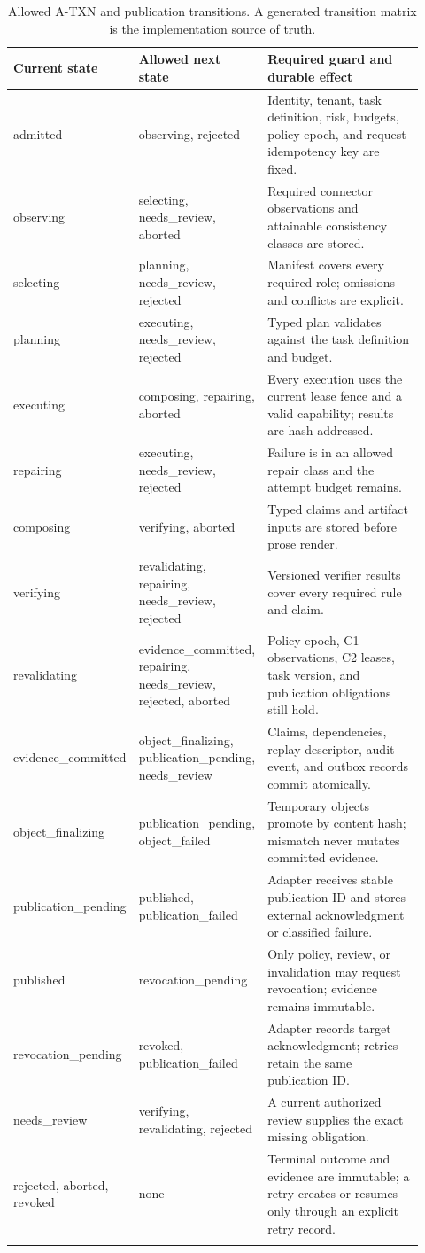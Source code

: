 \documentclass[10pt]{article}
\newcommand{\atxn}{\textsc{A-TXN}\xspace}
\begin{document}
\begin{longtable}{L{0.17\linewidth}L{0.26\linewidth}L{0.49\linewidth}}
\toprule
\textbf{Current state} & \textbf{Allowed next state} & \textbf{Required guard and durable effect} \\
\midrule
\endhead
admitted & observing, rejected & Identity, tenant, task definition, risk, budgets, policy epoch, and request idempotency key are fixed. \\
observing & selecting, needs\_review, aborted & Required connector observations and attainable consistency classes are stored. \\
selecting & planning, needs\_review, rejected & Manifest covers every required role; omissions and conflicts are explicit. \\
planning & executing, needs\_review, rejected & Typed plan validates against the task definition and budget. \\
executing & composing, repairing, aborted & Every execution uses the current lease fence and a valid capability; results are hash-addressed. \\
repairing & executing, needs\_review, rejected & Failure is in an allowed repair class and the attempt budget remains. \\
composing & verifying, aborted & Typed claims and artifact inputs are stored before prose render. \\
verifying & revalidating, repairing, needs\_review, rejected & Versioned verifier results cover every required rule and claim. \\
revalidating & evidence\_committed, repairing, needs\_review, rejected, aborted & Policy epoch, C1 observations, C2 leases, task version, and publication obligations still hold. \\
evidence\_committed & object\_finalizing, publication\_pending, needs\_review & Claims, dependencies, replay descriptor, audit event, and outbox records commit atomically. \\
object\_finalizing & publication\_pending, object\_failed & Temporary objects promote by content hash; mismatch never mutates committed evidence. \\
publication\_pending & published, publication\_failed & Adapter receives stable publication ID and stores external acknowledgment or classified failure. \\
published & revocation\_pending & Only policy, review, or invalidation may request revocation; evidence remains immutable. \\
revocation\_pending & revoked, publication\_failed & Adapter records target acknowledgment; retries retain the same publication ID. \\
needs\_review & verifying, revalidating, rejected & A current authorized review supplies the exact missing obligation. \\
rejected, aborted, revoked & none & Terminal outcome and evidence are immutable; a retry creates or resumes only through an explicit retry record. \\
\bottomrule
\caption{Allowed \atxn and publication transitions. A generated transition matrix is the implementation source of truth.}
\end{longtable}
\end{document}
